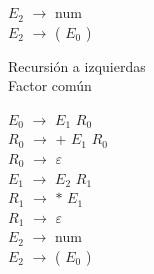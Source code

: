 \documentclass[\main/ApuntesPL.tex]{subfiles}
\begin{document}
      \begin{center}
        \begin{minipage}{.3\textwidth}
          \\
          \\
          \\
          \\
          \hspace*{5mm}$E_2$ $\rightarrow$ num\\
          \hspace*{5mm}$E_2$ $\rightarrow$ ( $E_0$ )\\
          \vspace*{2mm}

          {\color{red}Recursión a izquierdas}\\
          {\color{blue}Factor común}
        \end{minipage}%
        \begin{minipage}{.5\textwidth}
          \hspace*{5mm}$E_0$ $\rightarrow$ $E_1$ $R_0$\\
          \hspace*{5mm}$R_0$ $\rightarrow$ + $E_1$ $R_0$\\
          \hspace*{5mm}$R_0$ $\rightarrow$ $\varepsilon$\\
          \hspace*{5mm}$E_1$ $\rightarrow$ $E_2$ $R_1$\\
          \hspace*{5mm}$R_1$ $\rightarrow$ $\ast$ $E_1$\\
          \hspace*{5mm}$R_1$ $\rightarrow$ $\varepsilon$\\
          \hspace*{5mm}$E_2$ $\rightarrow$ num\\
          \hspace*{5mm}$E_2$ $\rightarrow$ ( $E_0$ )\\
          \vspace*{2mm}
        \end{minipage}
      \end{center}
\end{document}
